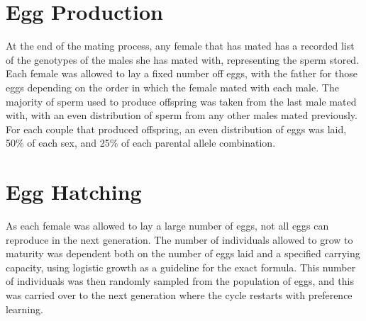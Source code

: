 \documentclass{article}
\begin{document}
\section{Egg Production}
At the end of the mating process, any female that has mated has a recorded list of the genotypes of the males she has mated with, representing the sperm stored. Each female was allowed to lay a fixed number off eggs, with the father for those eggs depending on the order in which the female mated with each male. The majority of sperm used to produce offspring was taken from the last male mated with, with an even distribution of sperm from any other males mated previously. For each couple that produced offspring, an even distribution of eggs was laid, 50\% of each sex, and 25\% of each parental allele combination.

\section{Egg Hatching}
As each female was allowed to lay a large number of eggs, not all eggs can reproduce in the next generation. The number of individuals allowed to grow to maturity was dependent both on the number of eggs laid and a specified carrying capacity, using logistic growth as a guideline for the exact formula. This number of individuals was then randomly sampled from the population of eggs, and this was carried over to the next generation where the cycle restarts with preference learning.

\printbibliography
\end{document}
